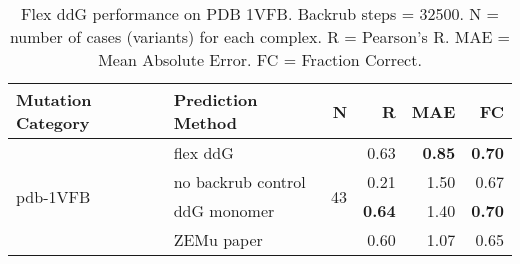 \begin{table}
  \begin{tabular}{llrrrr}
\toprule
Mutation Category &   Prediction Method &   N &    R &  MAE &   FC \\
\midrule
 \multirow{ 4}{*}{pdb-1VFB} & flex ddG & \multirow{ 4}{*}{43} & 0.63 & \textbf{0.85} & \textbf{0.70}  \\
 & no backrub control & & 0.21 & 1.50 & 0.67  \\
 & ddG monomer & & \textbf{0.64} & 1.40 & \textbf{0.70}  \\
 & ZEMu paper & & 0.60 & 1.07 & 0.65  \\
\bottomrule
\end{tabular}
  \caption[Flex ddG performance on PDB 1VFB]{
    Flex ddG performance on PDB 1VFB. Backrub steps = 32500. N = number of cases (variants) for each complex. R = Pearson's R. MAE = Mean Absolute Error. FC = Fraction Correct.
  } \label{tab:table-pdb-1VFB}
\end{table}
